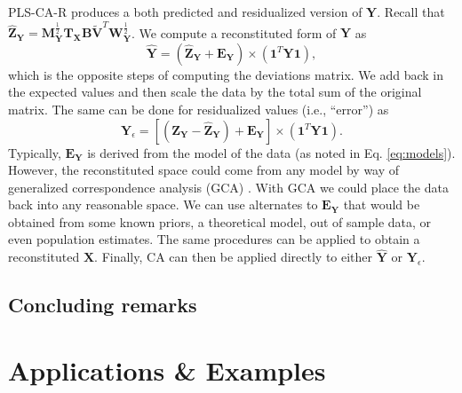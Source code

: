 \documentclass[12pt]{article}
\begin{document}
PLS-CA-R produces a both predicted and residualized version of
\({\mathbf Y}\). Recall that
\(\widehat{{\mathbf Z}}_{\mathbf Y} = {\mathbf M}^{\frac{1}{2}}_{\mathbf Y}{\mathbf T}_{\mathbf X}{\mathbf B}\widetilde{\mathbf V}^{T}{\mathbf W}^{\frac{1}{2}}_{\mathbf Y}\).
We compute a reconstituted form of \({\mathbf Y}\) as \begin{equation}
\widehat{\mathbf Y} = (\widehat{{\mathbf Z}}_{\mathbf Y} + {\mathbf E}_{\mathbf Y}) \times ({\mathbf 1}^{T}{\mathbf Y}{\mathbf 1}),
\label{eq:Yhat}
\end{equation} which is the opposite steps of computing the deviations
matrix. We add back in the expected values and then scale the data by
the total sum of the original matrix. The same can be done for
residualized values (i.e., ``error'') as \begin{equation}
{\mathbf Y}_{\epsilon} = [({\mathbf Z}_{\mathbf Y} - \widehat{{\mathbf Z}}_{\mathbf Y}) + {\mathbf E}_{\mathbf Y}] \times ({\mathbf 1}^{T}{\mathbf Y}{\mathbf 1}).
\label{eq:Yresid}
\end{equation} Typically, \({\mathbf E}_{\mathbf Y}\) is derived from
the model of the data (as noted in Eq. \ref{eq:models}). However, the
reconstituted space could come from any model by way of generalized
correspondence analysis (GCA)
\citetext{\citealp{escofier1983analyse}; \citealp{escofier1984analyse}; \citealp[for
more details and background see also][]{beaton2018generalization}}. With
GCA we could place the data back into any reasonable space. We can use
alternates to \({\mathbf E}_{\mathbf Y}\) that would be obtained from
some known priors, a theoretical model, out of sample data, or even
population estimates. The same procedures can be applied to obtain a
reconstituted \({\mathbf X}\). Finally, CA can then be applied directly
to either \(\widehat{\mathbf Y}\) or \({\mathbf Y}_{\epsilon}\).

\hypertarget{concluding-remarks}{%
\subsection{Concluding remarks}\label{concluding-remarks}}

\hypertarget{applications-examples}{%
\section{Applications \& Examples}\label{applications-examples}}

\label{section:appex}
\end{document}
